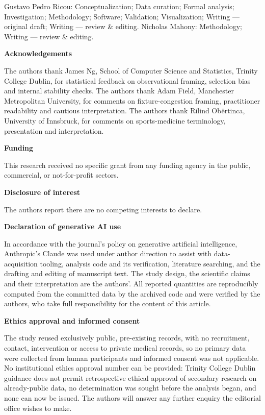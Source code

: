 \documentclass[11pt]{article}
\begin{document}
Gustavo Pedro Ricou: Conceptualization; Data curation; Formal analysis;
Investigation; Methodology; Software; Validation; Visualization; Writing ---
original draft; Writing --- review \& editing. Nicholas Mahony: Methodology;
Writing --- review \& editing.

\textbf{Acknowledgements}

The authors thank James Ng, School of Computer Science and Statistics,
Trinity College Dublin, for statistical feedback on observational framing,
selection bias and internal stability checks. The authors thank Adam Field,
Manchester Metropolitan University, for comments on fixture-congestion
framing, practitioner readability and cautious interpretation. The authors
thank Rilind Ob\"ertinca, University of Innsbruck, for comments on
sports-medicine terminology, presentation and interpretation.

\textbf{Funding}

This research received no specific grant from any funding agency in the
public, commercial, or not-for-profit sectors.

\textbf{Disclosure of interest}

The authors report there are no competing interests to declare.

\textbf{Declaration of generative AI use}

In accordance with the journal's policy on generative artificial intelligence,
Anthropic's Claude was used under author direction to assist with
data-acquisition tooling, analysis code and its verification, literature
searching, and the drafting and editing of manuscript text. The study design,
the scientific claims and their interpretation are the authors'. All reported
quantities are reproducibly computed from the committed data by the archived
code and were verified by the authors, who take full responsibility for the
content of this article.

\textbf{Ethics approval and informed consent}

The study reused exclusively public, pre-existing records, with no
recruitment, contact, intervention or access to private medical records, so no
primary data were collected from human participants and informed consent was
not applicable. No institutional ethics approval number can be provided:
Trinity College Dublin guidance does not permit retrospective ethical approval
of secondary research on already-public data, no determination was sought
before the analysis began, and none can now be issued. The authors will answer
any further enquiry the editorial office wishes to make.
\end{document}
